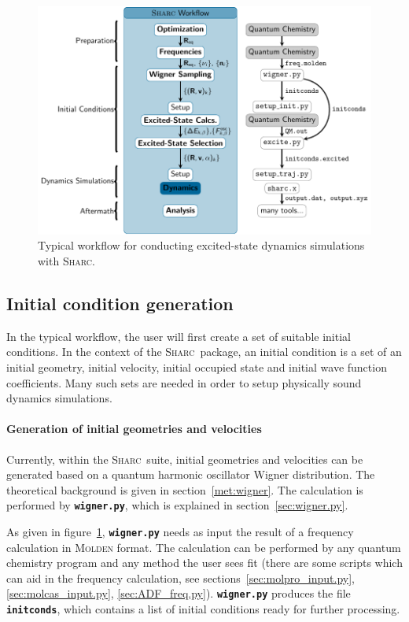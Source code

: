 \documentclass[a4paper,10pt,DIV=15,openany,twoside=false]{scrbook}
\newcommand{\sharc}{\textsc{Sharc}}
\newcommand{\ttt}[1]{\textbf{\texttt{#1}}}
\begin{document}
\begin{figure}[htb]
  \centering
  \includegraphics[scale=1]{img/workflow/prepare.pdf}
  \caption{Typical workflow for conducting excited-state dynamics simulations with \sharc.}
  \label{fig:workflow}
\end{figure}

\subsection{Initial condition generation}

In the typical workflow, the user will first create a set of suitable initial conditions. In the context of the \sharc\ package, an initial condition is a set of an initial geometry, initial velocity, initial occupied state and initial wave function coefficients. 
Many such sets are needed in order to setup physically sound dynamics simulations.

\paragraph{Generation of initial geometries and velocities}

Currently, within the \sharc\ suite, initial geometries and velocities can be generated based on a quantum harmonic oscillator Wigner distribution. The theoretical background is given in section~\ref{met:wigner}. The calculation is performed by \ttt{wigner.py}, which is explained in section~\ref{sec:wigner.py}. 

As given in figure~\ref{fig:workflow}, \ttt{wigner.py} needs as input the result of a frequency calculation in \textsc{Molden} format. The calculation can be performed by any quantum chemistry program and any method the user sees fit (there are some scripts which can aid in the frequency calculation, see sections~\ref{sec:molpro_input.py}, \ref{sec:molcas_input.py}, \ref{sec:ADF_freq.py}). 
\ttt{wigner.py} produces the file \ttt{initconds}, which contains a list of initial conditions ready for further processing.
\end{document}
